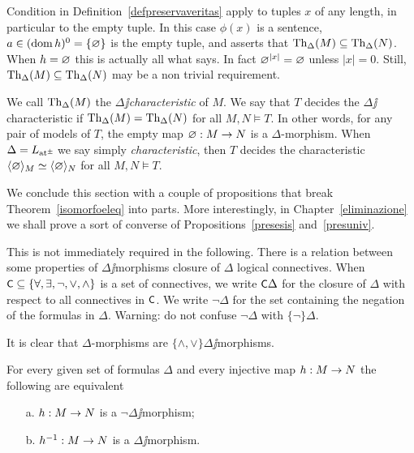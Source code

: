 \documentclass[creche.tex]{subfiles}
\begin{document}
\begin{remark}\label{rmk_characteristic}
Condition  in Definition~\ref{defpreservaveritas} apply to tuples $x$ of any length, in particular to the empty tuple. In this case $\phi(x)$ is a sentence, $a\in(\mathop{\rm dom} h)^0=\{\varnothing\}$ is the empty tuple, and  asserts that $\textrm{Th}_\Delta(M)\subseteq\textrm{Th}_\Delta(N)$. When $h=\varnothing$ this is actually all what  says. In fact $\varnothing^{|x|}=\varnothing$ unless $|x|=0$. Still,  $\textrm{Th}_\Delta(M)\subseteq\textrm{Th}_\Delta(N)$ may be a non trivial requirement.\QED
\end{remark}


\begin{definition}\label{def_characteristic}
We call $\textrm{Th}_\Delta(M)$ the \emph{$\Delta\jj$characteristic} of $M$. We say that $T$  decides the $\Delta\jj$characteristic if $\textrm{Th}_\Delta(M)=\textrm{Th}_\Delta(N)$ for all $M,N\models T$. In other words, for any pair of models of $T$, the empty map $\varnothing:M\to N$ is a $\Delta$-morphism. When $\Delta=L_{{\tiny\rm at^\pm}}\hskip-.3ex$ we say simply \emph{characteristic}, then $T$ decides the characteristic $\langle\varnothing\rangle_M\simeq\langle\varnothing\rangle_N$ for all $M,N\models T$.\QED
\end{definition}



We conclude this section with a couple of propositions that break Theorem~\ref{isomorfoeleq} into parts. More interestingly, in Chapter~\ref{eliminazione} we shall prove a sort of converse of Propositions~\ref{presesis} and~\ref{presuniv}.

This is not immediately required in the following. There is a relation between some properties of $\Delta\jj$morphisms closure of $\Delta$ logical connectives. When $\textsf{\small C}\subseteq\{\forall,\exists,\neg,\vee,\wedge\}$ is a set of connectives, we write \emph{$\textsf{\small C}\Delta$} for the closure of $\Delta$ with respect to all connectives in $\textsf{\small C}$. We write \emph{$\neg\Delta$} for the set containing the negation of the formulas in $\Delta$. Warning: do not confuse $\neg\Delta$ with $\{\neg\}\Delta$.

It is clear that $\Delta$-morphisms are  $\{\wedge,\vee\}\Delta\jj$morphisms.

\begin{proposition}\label{presneg}
For every given set of formulas $\Delta$ and every injective map $h:M\rightarrow N$ the following are equivalent
\begin{itemize}
\item[a.] $h:M\rightarrow N$ is a $\neg\Delta\jj$morphism;
\item[b.] $h^{-1}:M\rightarrow N$ is a $\Delta\jj$morphism.\QED
\end{itemize}
\end{proposition}
\end{document}
